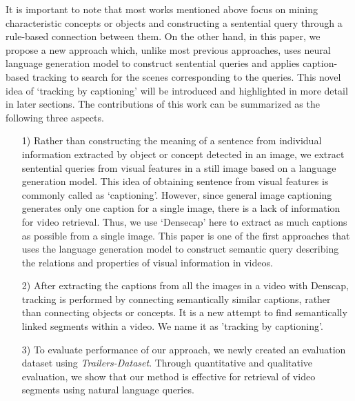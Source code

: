 It is important to note that most works mentioned above focus on mining characteristic concepts or objects and constructing a sentential query through a rule-based connection between them. On the other hand, in this paper, we propose a new approach which, unlike most previous approaches, uses neural language generation model to construct sentential queries and applies caption-based tracking to search for the scenes corresponding to the queries. This novel idea of `tracking by captioning' will be introduced and highlighted in more detail in later sections. The contributions of this work can be summarized as the following three aspects.

\begin{enumerate}[wide, labelwidth=!, labelindent=0pt]

\item[1)] Rather than constructing the meaning of a sentence from individual information extracted by object or concept detected in an image, we extract sentential queries from visual features in a still image based on a language generation model.  This idea of obtaining sentence from visual features is commonly called as `captioning'. However, since general image captioning generates only one caption for a single image, there is a lack of information for video retrieval. Thus, we use `Densecap'  \cite{johnson2016densecap} here to extract as much captions as possible from a single image. 
This paper is one of the first approaches that uses the language generation model to construct semantic query describing the relations and properties of visual information in videos.


\item[2)] After extracting the captions from all the images in a video with Denscap, tracking is performed by connecting semantically similar captions, rather than connecting objects or concepts. It is a new attempt to find semantically linked segments within a video. We name it as 'tracking by captioning'.


\item[3)] To evaluate performance of our approach, we newly created an evaluation dataset using {\itshape Trailers-Dataset}. 
Through quantitative and qualitative evaluation, we show that our method is effective for retrieval of video segments using natural language queries.

\end{enumerate}

\iffalse
For the randomly chosen 20 clips from Trailers-Dataset, we labeled the ground-truth time-stamp (start-frame and end-frame) about a particular scene. It is important to note that this is not the `video-annotation' such as objects, concepts, or, other spatial information. This set is only for evaluation, not for learning. In our method, annotation is only needed for the language model in Densecap to learn captions about still images. 
Therefore, as the language model learns more about the captions for more images, it can find more diverse semantic queries in the video.
\fi


